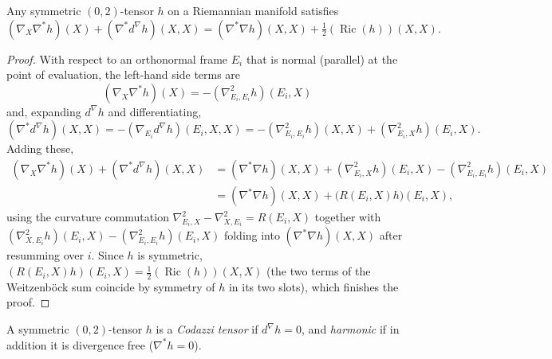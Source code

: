 \begin{theorem}[Theorem 9.4.3]
  \label{thm:pet-ch9-symmetric-tensor-lichnerowicz-identity}
  Any symmetric $(0,2)$-tensor $h$ on a Riemannian manifold satisfies
  \[
    (\nabla_X\nabla^*h)(X)+(\nabla^*d^\nabla h)(X,X)
    =(\nabla^*\nabla h)(X,X)+\tfrac12(\operatorname{Ric}(h))(X,X).
  \]
\end{theorem}
\begin{proof}
  With respect to an orthonormal frame $E_i$ that is normal (parallel) at the
  point of evaluation, the left-hand side terms are
  \[
    (\nabla_X\nabla^*h)(X)=-(\nabla^2_{E_i,E_i}h)(E_i,X)
  \]
  and, expanding $d^\nabla h$ and differentiating,
  \[
    (\nabla^*d^\nabla h)(X,X)=-(\nabla_{E_i}d^\nabla h)(E_i,X,X)
    =-(\nabla^2_{E_i,E_i}h)(X,X)+(\nabla^2_{E_i,X}h)(E_i,X).
  \]
  Adding these,
  \begin{align*}
    (\nabla_X\nabla^*h)(X)+(\nabla^*d^\nabla h)(X,X)
    &=(\nabla^*\nabla h)(X,X)+(\nabla^2_{E_i,X}h)(E_i,X)-(\nabla^2_{E_i,E_i}h)(E_i,X)\\
    &=(\nabla^*\nabla h)(X,X)+\big(R(E_i,X)h\big)(E_i,X),
  \end{align*}
  using the curvature commutation $\nabla^2_{E_i,X}-\nabla^2_{X,E_i}=R(E_i,X)$
  together with $(\nabla^2_{X,E_i}h)(E_i,X)-(\nabla^2_{E_i,E_i}h)(E_i,X)$ folding
  into $(\nabla^*\nabla h)(X,X)$ after resumming over $i$. Since $h$ is
  symmetric, $(R(E_i,X)h)(E_i,X)=\tfrac12(\operatorname{Ric}(h))(X,X)$ (the two terms of
  the Weitzenböck sum coincide by symmetry of $h$ in its two slots), which
  finishes the proof.
\end{proof}

\begin{definition}
  \label{def:pet-ch9-codazzi-harmonic-tensor}
  A symmetric $(0,2)$-tensor $h$ is a \emph{Codazzi tensor} if $d^\nabla h=0$,
  and \emph{harmonic} if in addition it is divergence free ($\nabla^*h=0$).
\end{definition}

